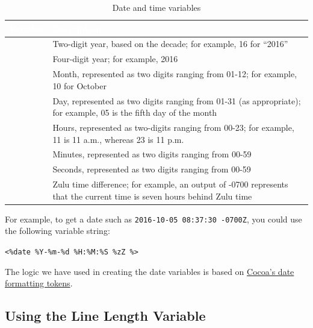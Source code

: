 \documentclass[../main.tex]{subfiles}
\begin{document}
\begingroup
\small
\setlength{\LTleft}{0.075\textwidth}
\setlength{\LTright}{0.075\textwidth}
\renewcommand{\arraystretch}{1.25}
\begin{xltabular}{0.85\textwidth}{|l|>{\raggedright\arraybackslash}X|}
  \caption{Date and time variables}\\
  \hline
  \textcolor{white}{\textbf{Variable}} & \textcolor{white}{\textbf{Description}} \\
  \hline
  \endhead
  \hline
  \endfoot
   & Two-digit year, based on the decade; for example, 16 for ``2016'' \\
  \hline
   & Four-digit year; for example, 2016 \\
  \hline
   & Month, represented as two digits ranging from 01-12; for example, 10 for
  October \\
  \hline
   & Day, represented as two digits ranging from 01-31 (as appropriate); for
  example, 05 is the fifth day of the month \\
  \hline
   & Hours, represented as two-digits ranging from 00-23; for example, 11 is 11
  a.m., whereas 23 is 11 p.m. \\
  \hline
   & Minutes, represented as two digits ranging from 00-59 \\
  \hline
   & Seconds, represented as two digits ranging from 00-59 \\
  \hline
   & Zulu time difference; for example, an output of -0700 represents that the
  current time is seven hours behind Zulu time \\
  \hline
\end{xltabular}
\endgroup

For example, to get a date such as \texttt{2016-10-05 08:37:30 -0700Z}, you could use the
following variable string:

\texttt{<\%date \%Y-\%m-\%d \%H:\%M:\%S \%zZ \%>}

\begin{ognote}
  The logic we have used in creating the date variables is based on
  \href{http://developer.apple.com/library/ios/documentation/cocoa/Conceptual/DataFormatting/Articles/dfDateFormatting10_4.html}{Cocoa's
  date formatting tokens}.
\end{ognote}

\subsection{Using the Line Length Variable}
\end{document}
